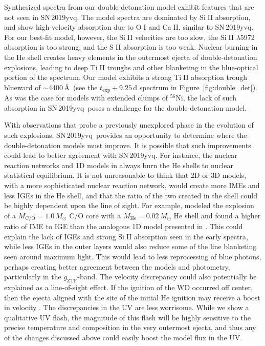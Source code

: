 \documentclass[twocolumn]{aastex63}
\def\ion#1#2{#1$\;${\footnotesize\rm{#2}}\relax}
\newcommand{\gztf}{$g_\mathrm{ZTF}$}
\newcommand{\radni}{$^{56}$Ni}
\newcommand{\sn}{SN\,2019yvq}
\begin{document}
Synthesized spectra from our double-detonation model exhibit features that are
not seen in \sn. The model spectra are dominated by \ion{Si}{II} absorption,
and show high-velocity absorption due to \ion{O}{I} and \ion{Ca}{II}, similar
to \sn. For our best-fit model, however, the \ion{Si}{II} velocities are too
slow, the \ion{Si}{II} $\lambda$5972 absorption is too strong, and the
\ion{S}{II} absorption is too weak. Nuclear burning in the He shell creates
heavy elements in the outermost ejecta of double-detonation explosions,
leading to deep \ion{Ti}{II} troughs and other blanketing in the blue-optical
portion of the spectrum. Our model exhibits a strong \ion{Ti}{II} absorption
trough blueward of $\sim$4400\,\AA\ (see the $t_\mathrm{exp} + 9.25$\,d
spectrum in Figure~\ref{fig:double_det}). As was the case for models with
extended clumps of \radni, the lack of such absorption in \sn\ poses a
challenge for the double-detonation model.

With observations that probe a previously unexplored phase in the evolution of
such explosions, \sn\ provides an opportunity to determine where the
double-detonation models must improve. It is possible that such improvements
could lead to better agreement with \sn. For instance, the nuclear reaction
networks and 1D models in \citet{Polin19} always burn the He shells to nuclear
statistical equilibrium. It is not unreasonable to think that 2D or 3D models,
with a more sophisticated nuclear reaction network, would create more IMEs and
less IGEs in the He shell, and that the ratio of the two created in the shell
could be highly dependent upon the line of sight. For example,
\citet{Townsley19} modeled the explosion of a $M_\mathrm{C/O} = 1.0\,M_\odot$
C/O core with a $M_\mathrm{He} = 0.02\,M_\odot$ He shell and found a higher
ratio of IME to IGE than the analogous 1D model presented in \citet[][though
see also \citealt{Gronow20}, which presents a 3D double-detonation explosion
with nuclear yields that are only mildly different from 1D models]{Polin19}.
This could explain the lack of IGEs and strong \ion{Si}{II} absorption seen in
the early spectra, while less IGEs in the outer layers would also reduce some
of the line blanketing seen around maximum light. This would lead to less
reprocessing of blue photons, perhaps creating better agreement between the
models and photometry, particularly in the \gztf-band. The velocity
discrepancy could also potentially be explained as a line-of-sight effect. If
the ignition of the WD occurred off center, then the ejecta aligned with the
site of the initial He ignition may receive a boost in velocity
\citep[e.g.,][]{Kromer10}. The discrepancies in the UV are less worrisome.
While we show a qualitative UV flash, the magnitude of this flash will be
highly sensitive to the precise temperature and composition in the very
outermost ejecta, and thus any of the changes discussed above could easily
boost the model flux in the UV.
\end{document}
